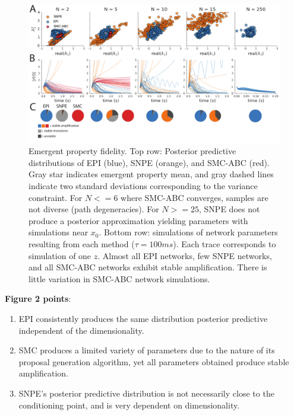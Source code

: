 \documentclass[11pt]{article}
\begin{document}
\begin{figure}[h]
\begin{center}
\includegraphics[scale=.75]{figs/StableAmplification_convergence.pdf}
\caption{\small Emergent property fidelity.  Top row: Posterior predictive distributions of EPI (blue), SNPE (orange), and SMC-ABC (red). 
Gray star indicates emergent property mean, and gray dashed lines indicate two standard deviations corresponding to the variance constraint.
For $N <= 6$ where SMC-ABC converges, samples are not diverse (path degeneracies).  
For $N >= 25$, SNPE does not produce a posterior approximation yielding parameters with simulations near $x_0$. 
Bottom row: simulations of network parameters resulting from each method ($\tau=100ms$).  Each trace corresponds to simulation of one $z$.  
Almost all EPI networks, few SNPE networks, and all SMC-ABC networks exhibit stable amplification.  
There is little variation in SMC-ABC network simulations.}
\end{center}
\end{figure}

\textbf{Figure 2 points}:
\begin{enumerate}
\item EPI consistently produces the same distribution posterior predictive independent of the dimensionality.
\item SMC produces a limited variety of parameters due to the nature of its proposal generation algorithm, yet all parameters obtained produce stable amplification.
\item SNPE's posterior predictive distribution is not necessarily close to the conditioning point, and is very dependent on dimensionality.
\end{enumerate}



\end{document}
